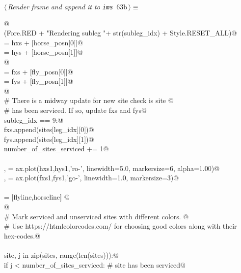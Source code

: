 \documentclass[11.5pt]{report}
\begin{document}
\begin{flushleft} \small\label{scrap97}\raggedright\small
{} $\langle\,${\itshape Render frame and append it to \verb|ims|}\nobreak\ {\footnotesize {63b}}$\,\rangle\equiv$
\vspace{-1ex}
\begin{list}{}{} \item
\mbox{}\verb@   @\\
\mbox{}\verb@debug(Fore.RED + "Rendering subleg "+ str(subleg_idx) + Style.RESET_ALL)@\\
\mbox{} = hxs + [horse_posn[0]]@\\
\mbox{} = hys + [horse_posn[1]]@\\
\mbox{}\verb@               @\\
\mbox{} = fxs + [fly_posn[0]]@\\
\mbox{} = fys + [fly_posn[1]]@\\
\mbox{}\verb@                 @\\
\mbox{}\verb@# There is a midway update for new site check is site @\\
\mbox{}\verb@# has been serviced. If so, update fxs and fys@\\
\mbox{}\verb@if subleg_idx == 9:@\\
\mbox{}\verb@    fxs.append(sites[leg_idx][0])@\\
\mbox{}\verb@    fys.append(sites[leg_idx][1])@\\
\mbox{}\verb@    number_of_sites_serviced += 1@\\
\mbox{}\verb@@\\
\mbox{}\verb@horseline, = ax.plot(hxs1,hys1,'ro-', linewidth=5.0, markersize=6, alpha=1.00)@\\
\mbox{}\verb@flyline,   = ax.plot(fxs1,fys1,'go-', linewidth=1.0, markersize=3)@\\
\mbox{}\verb@@\\
\mbox{}\verb@objs = [flyline,horseline] @\\
\mbox{}\verb@ @\\
\mbox{}\verb@# Mark serviced and unserviced sites with different colors. @\\
\mbox{}\verb@# Use https://htmlcolorcodes.com/ for choosing good colors along with their hex-codes.@\\
\mbox{}\verb@@\\
\mbox{}\verb@for site, j in zip(sites, range(len(sites))):@\\
\mbox{}\verb@    if j < number_of_sites_serviced:       # site has been serviced@\\

\end{list}
\end{flushleft}
\end{document}
